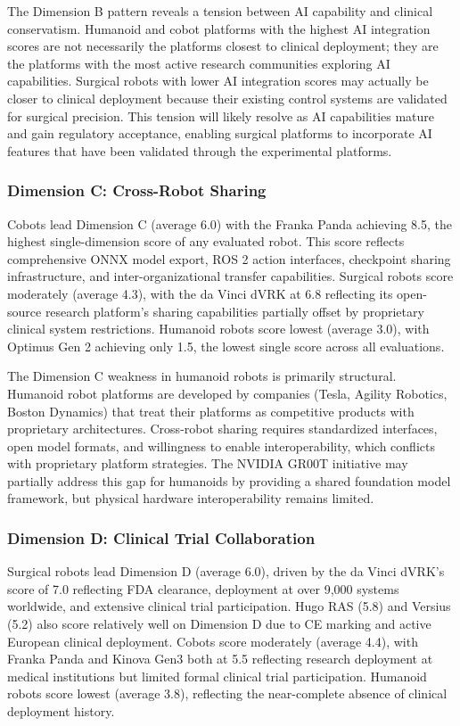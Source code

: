 The Dimension B pattern reveals a tension between AI capability and clinical
conservatism. Humanoid and cobot platforms with the highest AI integration
scores are not necessarily the platforms closest to clinical deployment; they
are the platforms with the most active research communities exploring AI
capabilities. Surgical robots with lower AI integration scores may actually be
closer to clinical deployment because their existing control systems are
validated for surgical precision. This tension will likely resolve as AI
capabilities mature and gain regulatory acceptance, enabling surgical platforms
to incorporate AI features that have been validated through the experimental
platforms.

\subsubsection{Dimension C: Cross-Robot Sharing}

Cobots lead Dimension C (average 6.0) with the Franka Panda achieving 8.5, the
highest single-dimension score of any evaluated robot. This score reflects
comprehensive ONNX model export, ROS 2 action interfaces, checkpoint sharing
infrastructure, and inter-organizational transfer capabilities. Surgical robots
score moderately (average 4.3), with the da Vinci dVRK at 6.8 reflecting its
open-source research platform's sharing capabilities partially offset by
proprietary clinical system restrictions. Humanoid robots score lowest (average
3.0), with Optimus Gen 2 achieving only 1.5, the lowest single score across
all evaluations.

The Dimension C weakness in humanoid robots is primarily structural. Humanoid
robot platforms are developed by companies (Tesla, Agility Robotics, Boston
Dynamics) that treat their platforms as competitive products with proprietary
architectures. Cross-robot sharing requires standardized interfaces, open model
formats, and willingness to enable interoperability, which conflicts with
proprietary platform strategies. The NVIDIA GR00T initiative may partially
address this gap for humanoids by providing a shared foundation model framework,
but physical hardware interoperability remains limited.

\subsubsection{Dimension D: Clinical Trial Collaboration}

Surgical robots lead Dimension D (average 6.0), driven by the da Vinci dVRK's
score of 7.0 reflecting FDA clearance, deployment at over 9,000 systems
worldwide, and extensive clinical trial participation. Hugo RAS (5.8) and
Versius (5.2) also score relatively well on Dimension D due to CE marking and
active European clinical deployment. Cobots score moderately (average 4.4),
with Franka Panda and Kinova Gen3 both at 5.5 reflecting research deployment
at medical institutions but limited formal clinical trial participation.
Humanoid robots score lowest (average 3.8), reflecting the near-complete
absence of clinical deployment history.

